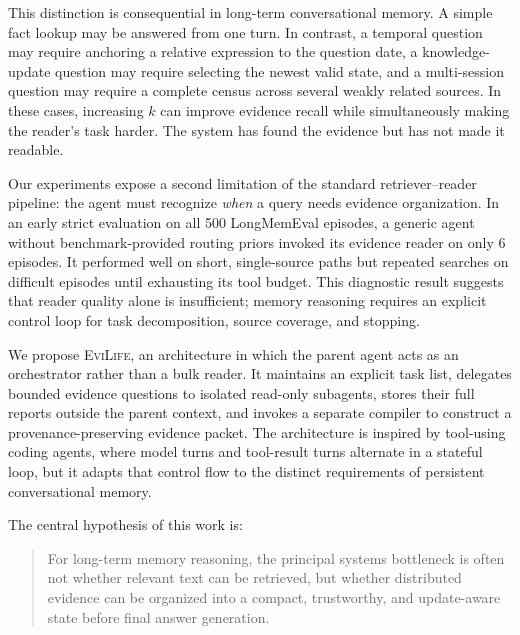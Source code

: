 \documentclass{article}
\newcommand{\method}{\textsc{EviLife}}
\begin{document}
This distinction is consequential in long-term conversational memory. A simple
fact lookup may be answered from one turn. In contrast, a temporal question may
require anchoring a relative expression to the question date, a knowledge-update
question may require selecting the newest valid state, and a multi-session
question may require a complete census across several weakly related sources.
In these cases, increasing $k$ can improve evidence recall while simultaneously
making the reader's task harder. The system has found the evidence but has not
made it readable.

Our experiments expose a second limitation of the standard retriever--reader
pipeline: the agent must recognize \emph{when} a query needs evidence
organization. In an early strict evaluation on all 500 LongMemEval episodes, a
generic agent without benchmark-provided routing priors invoked its evidence
reader on only 6 episodes. It performed well on short, single-source paths but
repeated searches on difficult episodes until exhausting its tool budget. This
diagnostic result suggests that reader quality alone is insufficient; memory
reasoning requires an explicit control loop for task decomposition, source
coverage, and stopping.

We propose \method, an architecture in which the parent agent acts as an
orchestrator rather than a bulk reader. It maintains an explicit task list,
delegates bounded evidence questions to isolated read-only subagents, stores
their full reports outside the parent context, and invokes a separate compiler
to construct a provenance-preserving evidence packet. The architecture is
inspired by tool-using coding agents, where model turns and tool-result turns
alternate in a stateful loop, but it adapts that control flow to the distinct
requirements of persistent conversational memory.

The central hypothesis of this work is:

\begin{quote}
For long-term memory reasoning, the principal systems bottleneck is often not
whether relevant text can be retrieved, but whether distributed evidence can be
organized into a compact, trustworthy, and update-aware state before final
answer generation.
\end{quote}
\end{document}
